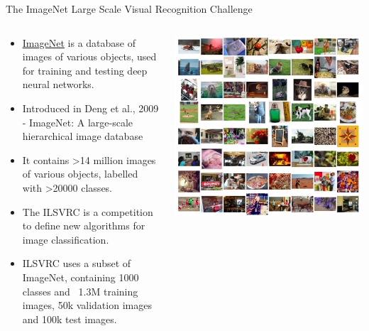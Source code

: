 \documentclass[9pt, aspectratio=169]{beamer}
\begin{document}
\begin{frame}
    {The ImageNet Large Scale Visual Recognition Challenge}
    \begin{columns}
        \begin{column}{.5\textwidth}
            \begin{itemize}
                \item \href{https://www.image-net.org}{\underline{ImageNet}} is a database of images of various objects, used for training and testing deep neural networks.
                \item Introduced in Deng et al., 2009 - ImageNet: A large-scale hierarchical image database
                \item It contains >14 million images of various objects, labelled with >20000 classes.
                \item The ILSVRC is a competition to define new algorithms for image classification.
                \item ILSVRC uses a subset of ImageNet, containing 1000 classes and ~1.3M training images, 50k validation images and 100k test images.
            \end{itemize}
        \end{column}
        \begin{column}{.5\textwidth}
            \includegraphics[width=\textwidth]{imagenet.png}
        \end{column}
    \end{columns}
\end{frame}
\end{document}
